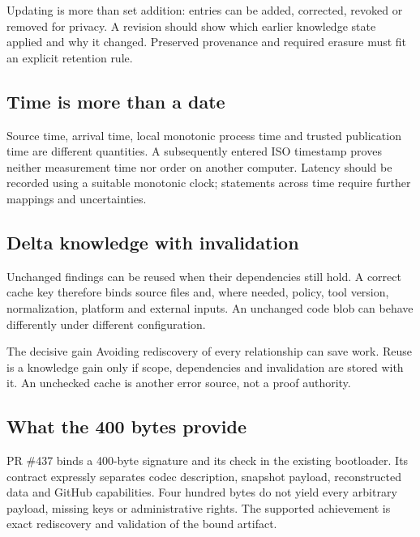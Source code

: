 \begin{cols}
Updating is more than set addition: entries can be added, corrected, revoked or removed for privacy. A revision should show which earlier knowledge state applied and why it changed. Preserved provenance and required erasure must fit an explicit retention rule.

\subsection*{Time is more than a date}
Source time, arrival time, local monotonic process time and trusted publication time are different quantities. A subsequently entered ISO timestamp proves neither measurement time nor order on another computer. Latency should be recorded using a suitable monotonic clock; statements across time require further mappings and uncertainties.

\subsection*{Delta knowledge with invalidation}
Unchanged findings can be reused when their dependencies still hold. A correct cache key therefore binds source files and, where needed, policy, tool version, normalization, platform and external inputs. An unchanged code blob can behave differently under different configuration. 

\begin{boundary}{The decisive gain}
Avoiding rediscovery of every relationship can save work. Reuse is a knowledge gain only if scope, dependencies and invalidation are stored with it. An unchecked cache is another error source, not a proof authority.
\end{boundary}

\subsection*{What the 400 bytes provide}
PR \#437 binds a 400-byte signature and its check in the existing bootloader. Its contract expressly separates codec description, snapshot payload, reconstructed data and GitHub capabilities. Four hundred bytes do not yield every arbitrary payload, missing keys or administrative rights. The supported achievement is exact rediscovery and validation of the bound artifact. 
\end{cols}

